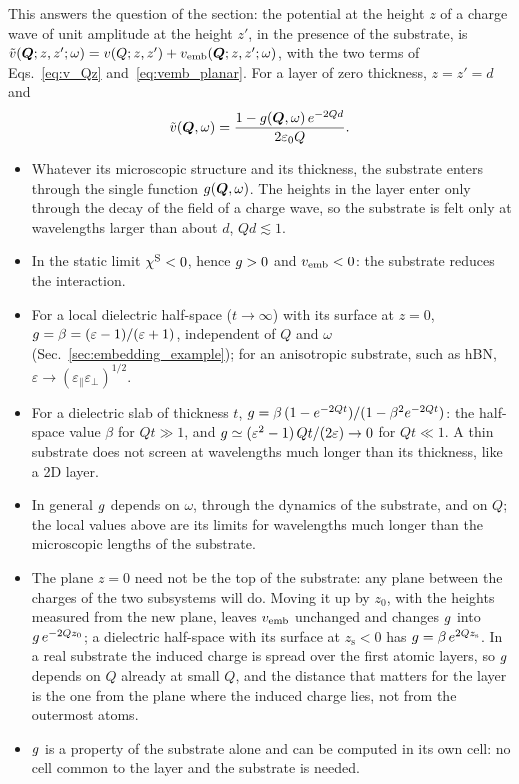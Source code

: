 \documentclass[10pt,a4paper]{paper}
\begin{document}
This answers the question of the section: the potential at the height $z$ of a charge wave of unit amplitude at the
height $z'$, in the presence of the substrate, is $\tilde{v}(\bm{Q};z,z';\omega) = v(Q;z,z') + v_{\mathrm{emb}}(\bm{Q};z,z';\omega)$, with
the two terms of Eqs.~\eqref{eq:v_Qz} and~\eqref{eq:vemb_planar}. For a layer of zero thickness, $z = z' = d$ and
\begin{equation*}
\tilde{v}(\bm{Q},\omega) = \frac{1 - g(\bm{Q},\omega)\,e^{-2Qd}}{2\varepsilon_0 Q} .
\end{equation*}
\begin{itemize}
\item Whatever its microscopic structure and its thickness, the substrate enters through the single function
  $g(\bm{Q},\omega)$. The heights in the layer enter only through the decay of the field of a charge wave, so the
  substrate is felt only at wavelengths larger than about $d$, $Qd \lesssim 1$.
\item In the static limit $\chi^{\mathrm{S}} < 0$, hence $g > 0$ and $v_{\mathrm{emb}} < 0$: the substrate reduces the interaction.
\item For a local dielectric half-space ($t \to \infty$) with its surface at $z = 0$,
  $g = \beta = (\varepsilon - 1)/(\varepsilon + 1)$, independent of $Q$ and $\omega$
  (Sec.~\ref{sec:embedding_example}); for an anisotropic substrate, such as hBN,
  $\varepsilon \to (\varepsilon_\parallel\varepsilon_\perp)^{1/2}$.
\item For a dielectric slab of thickness $t$, $g = \beta\,(1 - e^{-2Qt})/(1 - \beta^2 e^{-2Qt})$: the half-space
  value $\beta$ for $Qt \gg 1$, and $g \simeq (\varepsilon^2 - 1)\,Qt/(2\varepsilon) \to 0$ for $Qt \ll 1$. A thin
  substrate does not screen at wavelengths much longer than its thickness, like a 2D layer.
\item In general $g$ depends on $\omega$, through the dynamics of the substrate, and on $Q$; the local values above
  are its limits for wavelengths much longer than the microscopic lengths of the substrate.
\item The plane $z = 0$ need not be the top of the substrate: any plane between the charges of the two subsystems
  will do. Moving it up by $z_0$, with the heights measured from the new plane, leaves $v_{\mathrm{emb}}$ unchanged and changes
  $g$ into $g\,e^{-2Qz_0}$; a dielectric half-space with its surface at $z_{\mathrm{s}} < 0$ has
  $g = \beta\,e^{2Qz_{\mathrm{s}}}$. In a real substrate the induced charge is spread over the first atomic layers,
  so $g$ depends on $Q$ already at small $Q$, and the distance that matters for the layer is the one from the plane
  where the induced charge lies, not from the outermost atoms.
\item $g$ is a property of the substrate alone and can be computed in its own cell: no cell common to the layer and
  the substrate is needed.
\end{itemize}
\end{document}
